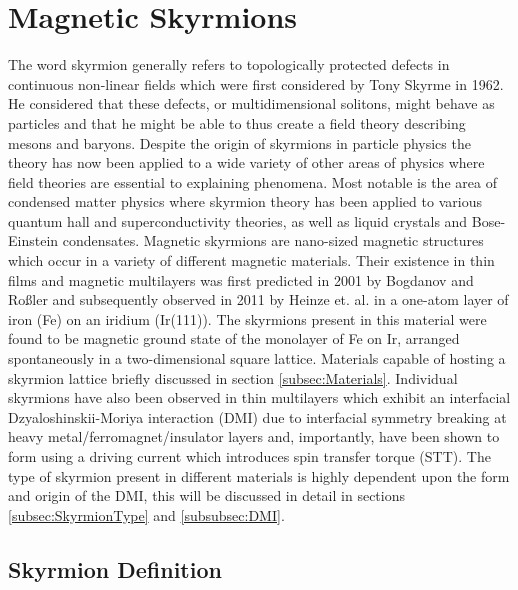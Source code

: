 \section{Magnetic Skyrmions}\label{sec:MagSkyrmions}
The word skyrmion generally refers to topologically protected defects in continuous non-linear fields which were first considered by Tony Skyrme in 1962.\cite{Skyrme1962} He considered that these defects, or multidimensional solitons, might behave as particles and that he might be able to thus create a field theory describing mesons and baryons. Despite the origin of skyrmions in particle physics the theory has now been applied to a wide variety of other areas of physics where field theories are essential to explaining phenomena. Most notable is the area of condensed matter physics where  skyrmion theory has been applied to various quantum hall and superconductivity theories\cite{Rho2016}, as well as liquid crystals \cite{Wright1989} and Bose-Einstein condensates.\cite{AlKhawaja2001,Brey1995}
Magnetic skyrmions are nano-sized magnetic structures which occur in a variety of different magnetic materials.\cite{Fert2017} Their existence in thin films and magnetic multilayers was first predicted in 2001 by Bogdanov and Ro{\ss}ler\cite{Bogdanov2001} and subsequently observed in 2011 by Heinze et. al.\cite{Heinze2011} in a one-atom layer of iron (Fe) on an iridium (Ir(111)). The skyrmions present in this material were found to be magnetic ground state of the monolayer of Fe on Ir, arranged spontaneously in a two-dimensional square lattice. Materials capable of hosting a skyrmion lattice briefly discussed in section \ref{subsec:Materials}. Individual skyrmions have also been observed in thin multilayers which exhibit an interfacial Dzyaloshinskii-Moriya interaction (DMI)\cite{Moriya1960, Dzyaloshinskii1958} due to interfacial symmetry breaking at heavy metal/ferromagnet/insulator layers and, importantly, have been shown to form using a driving current which introduces  spin transfer torque (STT).\cite{Jiang2015} The type of skyrmion present in different materials is highly dependent upon the form and origin of the DMI, this will be discussed in detail in sections \ref{subsec:SkyrmionType} and \ref{subsubsec:DMI}.

    \subsection{Skyrmion Definition}\label{subsec:SkyrDefn}

